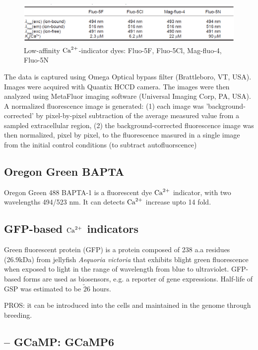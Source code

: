 \begin{figure}[hbt]
  \centerline{\includegraphics[height=2.2cm,
    angle=0]{./images/fluo-4_lowaffinity.eps}}
\caption{Low-affinity ${\text{Ca}^{2+}}$-indicator dyes: Fluo-5F, Fluo-5Cl,
  Mag-fluo-4, Fluo-5N}
\label{fig:low-affinity}
\end{figure}

The data is captured using Omega Optical bypass filter (Brattleboro, VT, USA).
Images were acquired with Quantix HCCD camera. The images were then analyzed
using MetaFluor imaging software (Universal Imaging Corp, PA, USA). A normalized
fluorescence image is generated: (1) each image was 'background-corrected' by
pixel-by-pixel subtraction of the average measured value from a sampled
extracellular region, (2) the background-corrected fluorescence image was then
normalized, pixel by pixel, to the fluorescence masured in a single image from
the initial control conditions (to subtract autofluorscence)


\subsection{Oregon Green BAPTA}
\label{sec:Oregon-Green-BAPTA}

Oregon Green 488 BAPTA-1 is a fluorescent dye ${\text{Ca}^{2+}}$ indicator, with two
wavelengths 494/523 nm. It can detects ${\text{Ca}^{2+}}$ increase upto 14 fold.

\subsection{GFP-based ${\text{Ca}^{2+}}$ indicators}
\label{sec:GFP_dye}

Green fluorescent protein (GFP) is a protein composed of 238 a.a residues
(26.9kDa) from jellyfish {\it Aequoria victoria} that exhibits blight green
fluorescence when exposed to light in the range of wavelength from blue to
ultraviolet. GFP-based forms are used as biosensors, e.g. a reporter of gene
expressions. Half-life of GSP was estimated to be $\tilde 26$ hours.

PROS: it can be introduced into the cells and maintained in the genome through
breeding.



\subsection{-- GCaMP: GCaMP6}
\label{sec:GCaMP6}


